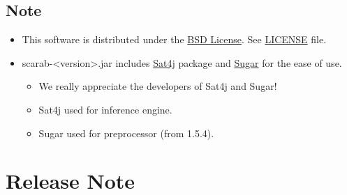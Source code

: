 \documentclass[11pt]{article}
\begin{document}
\subsection*{Note}
\label{sec-1-3}
\begin{itemize}
\item This software is distributed under the \href{http://opensource.org/licenses/bsd-license.php}{BSD License}. See \href{./LICENSE}{LICENSE} file.
\item scarab-<version>.jar includes \href{http://www.sat4j.org}{Sat4j} package and \href{http://bach.istc.kobe-u.ac.jp/sugar/}{Sugar} for the ease of use.
\begin{itemize}
\item We really appreciate the developers of Sat4j and Sugar!
\item Sat4j used for inference engine.
\item Sugar used for preprocessor (from 1.5.4).
\end{itemize}
\end{itemize}

\section*{Release Note}
\label{sec-2}
\end{document}
